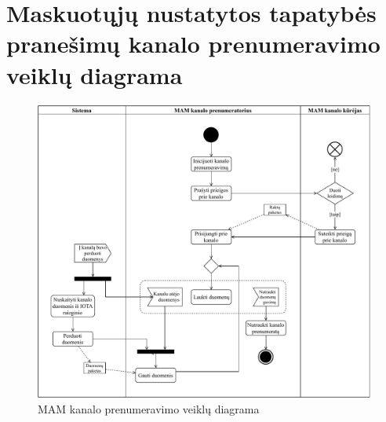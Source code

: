 \section{Maskuotųjų nustatytos tapatybės pranešimų kanalo prenumeravimo veiklų diagrama} \label{appendix:5}
\begin{figure}[H]
    \centering
    \includegraphics[scale=0.7]{images/ad-2}
    \caption{MAM kanalo prenumeravimo veiklų diagrama}
\end{figure}

